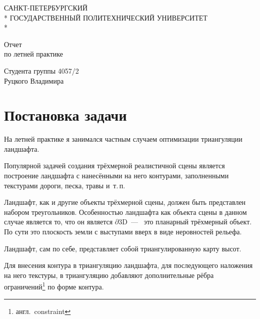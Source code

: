 \documentclass[a4paper,10pt,titlepage]{report}
\begin{document}
\begin{titlepage}
\newpage

\begin{center}
САНКТ-ПЕТЕРБУРГСКИЙ \\*
ГОСУДАРСТВЕННЫЙ ПОЛИТЕХНИЧЕСКИЙ УНИВЕРСИТЕТ \\*
\hrulefill
\end{center}


\vspace{8em}

\begin{center}
\Large Отчет \\ по летней практике %
\end{center}

\vspace{8.5em}

\begin{center}
Студента группы 4057/2 \\ Руцкого Владимира
\end{center}

\vspace{\fill}

\end{titlepage}
\pagebreak


\section*{Постановка задачи}
На летней практике я занимался частным случаем оптимизации триангуляции ландшафта.

Популярной задачей создания трёхмерной реалистичной сцены является построение ландшафта 
с нанесёнными на него контурами, заполненными текстурами дороги, песка, травы и~т.\,п.

Ландшафт, как и другие объекты трёхмерной сцены, должен быть представлен набором треугольников.
Особенностью ландшафта как объекта сцены в данном случае является то, что он является $\partial 3\mathrm{D}$~---~
это планарный трёхмерный объект.
По сути это плоскость земли с выступами вверх в виде неровностей рельефа.

Ландшафт, сам по себе, представляет собой триангулированную карту высот.

Для внесения контура в триангуляцию ландшафта, для последующего наложения на него текстуры,
в триангуляцию добавляют дополнительные рёбра ограничений\footnote{англ.~constraint} по форме контура.
\end{document}
